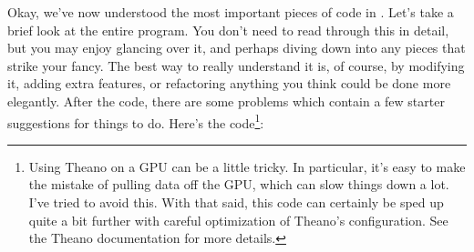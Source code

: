 \documentclass[a4paper,twoside,10pt]{book}
\begin{document}
Okay, we've now understood the most important pieces of code in . Let's take a brief look at the entire program. You don't need to read through this in detail, but you may enjoy glancing over it, and perhaps diving down into any pieces that strike your fancy. The best way to really understand it is, of course, by modifying it, adding extra features, or refactoring anything you think could be done more elegantly. After the code, there are some problems which contain a few starter suggestions for things to do. Here's the code\footnote{Using Theano on a GPU can be a little tricky. In particular, it's easy to make the mistake of pulling data off the GPU, which can slow things down a lot. I've tried to avoid this. With that said, this code can certainly be sped up quite a bit further with careful optimization of Theano's configuration. See the Theano documentation for more details.}:
\end{document}
